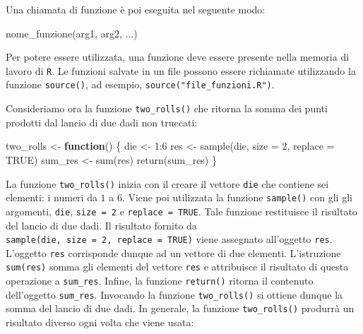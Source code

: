 \documentclass[
  11pt,
]{krantz}
\makeatletter
\newenvironment{Shaded}{\begin{snugshade}}{\end{snugshade}}
\newcommand{\AttributeTok}[1]{\textcolor[rgb]{0.61,0.61,0.61}{#1}}
\newcommand{\ConstantTok}[1]{\textcolor[rgb]{0,0,0}{#1}}
\newcommand{\ControlFlowTok}[1]{\textcolor[rgb]{0.27,0.27,0.27}{\textbf{#1}}}
\newcommand{\DecValTok}[1]{\textcolor[rgb]{0.06,0.06,0.06}{#1}}
\newcommand{\FunctionTok}[1]{\textcolor[rgb]{0,0,0}{#1}}
\newcommand{\NormalTok}[1]{#1}
\newcommand{\OtherTok}[1]{\textcolor[rgb]{0.37,0.37,0.37}{#1}}
\newcommand{\SpecialCharTok}[1]{\textcolor[rgb]{0,0,0}{#1}}
\newenvironment{kframe}{%
\medskip{}
\setlength{\fboxsep}{.8em}
 \def\at@end@of@kframe{}%
 \ifinner\ifhmode%
  \def\at@end@of@kframe{\end{minipage}}%
  \begin{minipage}{\columnwidth}%
 \fi\fi%
 \def\FrameCommand##1{\hskip\@totalleftmargin \hskip-\fboxsep
 \colorbox{shadecolor}{##1}\hskip-\fboxsep
     \hskip-\linewidth \hskip-\@totalleftmargin \hskip\columnwidth}%
 \MakeFramed {\advance\hsize-\width
   \@totalleftmargin\z@ \linewidth\hsize
   \@setminipage}}%
 {\par\unskip\endMakeFramed%
 \at@end@of@kframe}
\renewenvironment{Shaded}{\begin{kframe}}{\end{kframe}}
\theoremstyle{definition}
\theoremstyle{definition}
\theoremstyle{definition}
\theoremstyle{definition}
\theoremstyle{remark}
\makeatother
\begin{document}
Una chiamata di funzione è poi eseguita nel seguente modo:

\begin{Shaded}
\begin{Highlighting}[]
\FunctionTok{nome\_funzione}\NormalTok{(arg1, arg2, ...)}
\end{Highlighting}
\end{Shaded}

Per potere essere utilizzata, una funzione deve essere presente nella memoria di lavoro di \texttt{R}. Le funzioni salvate in un file possono essere richiamate utilizzando la funzione \texttt{source()}, ad esempio, \texttt{source("file\_funzioni.R")}.

Consideriamo ora la funzione \texttt{two\_rolls()} che ritorna la somma dei punti prodotti dal lancio di due dadi non truccati:

\begin{Shaded}
\begin{Highlighting}[]
\NormalTok{two\_rolls }\OtherTok{\textless{}{-}} \ControlFlowTok{function}\NormalTok{() \{}
\NormalTok{  die }\OtherTok{\textless{}{-}} \DecValTok{1}\SpecialCharTok{:}\DecValTok{6}
\NormalTok{  res }\OtherTok{\textless{}{-}} \FunctionTok{sample}\NormalTok{(die, }\AttributeTok{size =} \DecValTok{2}\NormalTok{, }\AttributeTok{replace =} \ConstantTok{TRUE}\NormalTok{)}
\NormalTok{  sum\_res }\OtherTok{\textless{}{-}} \FunctionTok{sum}\NormalTok{(res)}
  \FunctionTok{return}\NormalTok{(sum\_res)}
\NormalTok{\}}
\end{Highlighting}
\end{Shaded}

La funzione \texttt{two\_rolls()} inizia con il creare il vettore \texttt{die} che contiene sei elementi: i numeri da \(1\) a \(6\). Viene poi utilizzata la funzione \texttt{sample()} con gli gli argomenti, \texttt{die}, \texttt{size\ =\ 2} e \texttt{replace\ =\ TRUE}. Tale funzione restituisce il risultato del lancio di due dadi. Il risultato fornito da \texttt{sample(die,\ size\ =\ 2,\ replace\ =\ TRUE)} viene assegnato all'oggetto \texttt{res}. L'oggetto \texttt{res} corrisponde dunque ad un vettore di due elementi. L'istruzione \texttt{sum(res)} somma gli elementi del vettore \texttt{res} e attribuisce il risultato di questa operazione a \texttt{sum\_res}. Infine, la funzione \texttt{return()} ritorna il contenuto dell'oggetto \texttt{sum\_res}. Invocando la funzione \texttt{two\_rolls()} si ottiene dunque la somma del lancio di due dadi. In generale, la funzione \texttt{two\_rolls()} produrrà un risultato diverso ogni volta che viene usata:
\end{document}
